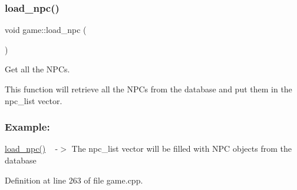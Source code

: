 \subsubsection{\texorpdfstring{load\+\_\+npc()}{load\_npc()}}
{\footnotesize\ttfamily void game\+::load\+\_\+npc (\begin{DoxyParamCaption}{ }\end{DoxyParamCaption})\hspace{0.3cm}{\ttfamily [private]}}



Get all the N\+PC\textquotesingle{}s. 

This function will retrieve all the N\+PC\textquotesingle{}s from the database and put them in the \textquotesingle{}npc\+\_\+list\textquotesingle{} vector.~\newline


\subsubsection*{Example\+: }

\hyperlink{classgame_a3718980f99cd44e9c882c2aa67368450}{load\+\_\+npc()} ~\newline
-\/$>$ The npc\+\_\+list vector will be filled with N\+PC objects from the database 

Definition at line 263 of file game.\+cpp.

